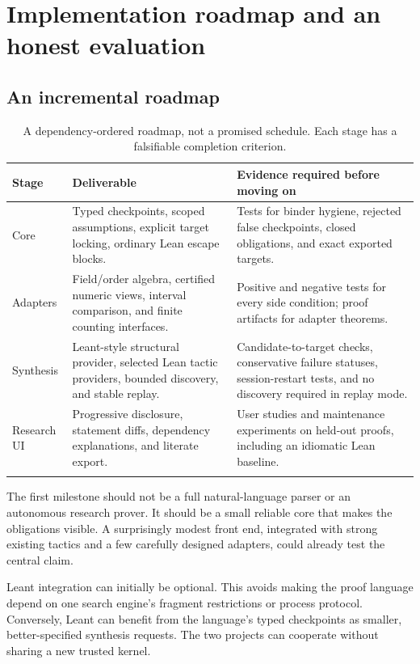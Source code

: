 \documentclass[11pt,a4paper]{article}
\theoremstyle{definition}
\theoremstyle{remark}
\begin{document}
\section{Implementation roadmap and an honest evaluation}
\label{sec:evaluation}
\subsection{An incremental roadmap}
\begin{longtable}{@{}L{.14\linewidth}L{.38\linewidth}L{.40\linewidth}@{}}
\toprule
Stage & Deliverable & Evidence required before moving on\\
\midrule\endhead
Core & Typed checkpoints, scoped assumptions, explicit target locking, ordinary Lean escape blocks. & Tests for binder hygiene, rejected false checkpoints, closed obligations, and exact exported targets.\\
Adapters & Field/order algebra, certified numeric views, interval comparison, and finite counting interfaces. & Positive and negative tests for every side condition; proof artifacts for adapter theorems.\\
Synthesis & Leant-style structural provider, selected Lean tactic providers, bounded discovery, and stable replay. & Candidate-to-target checks, conservative failure statuses, session-restart tests, and no discovery required in replay mode.\\
Research UI & Progressive disclosure, statement diffs, dependency explanations, and literate export. & User studies and maintenance experiments on held-out proofs, including an idiomatic Lean baseline.\\
\bottomrule
\caption{A dependency-ordered roadmap, not a promised schedule. Each stage has a falsifiable completion criterion.}
\end{longtable}

The first milestone should not be a full natural-language parser or an autonomous research prover. It should be a small reliable core that makes the obligations visible. A surprisingly modest front end, integrated with strong existing tactics and a few carefully designed adapters, could already test the central claim.

Leant integration can initially be optional. This avoids making the proof language depend on one search engine's fragment restrictions or process protocol. Conversely, Leant can benefit from the language's typed checkpoints as smaller, better-specified synthesis requests. The two projects can cooperate without sharing a new trusted kernel.
\end{document}
